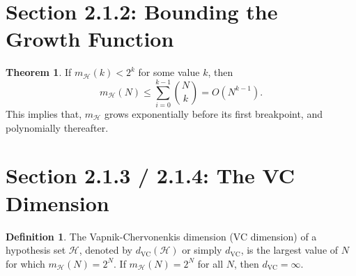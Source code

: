 \documentclass[10pt]{exam}
\theoremstyle{definition}
\newtheorem{problem}{Problem}
\newtheorem{defn}{Definition}
\newtheorem{fact}{Fact}
\newtheorem{theorem}{Theorem}
\newcommand{\R}{\mathbb R}
\newcommand{\mH}{m_{\mathcal H}}
\newcommand{\dvc}{{d_{\text{VC}}}}
\begin{document}
\newpage




\section*{Section 2.1.2: Bounding the Growth Function}

\begin{theorem}
    If $\mH(k) < 2^k$ for some value $k$, then
    \begin{equation}
        \mH(N)
        \le \sum_{i=0}^{k-1} {N \choose k}
        =
        O(N^{k-1})
        .
    \end{equation}
    This implies that, $\mH$ grows exponentially before its first breakpoint,
    and polynomially thereafter.
\end{theorem}

\newpage
\section*{Section 2.1.3 / 2.1.4: The VC Dimension}

\begin{defn}
    The Vapnik-Chervonenkis dimension (VC dimension) of a hypothesis set $\mathcal H$, denoted by $\dvc(\mathcal H)$ or simply $\dvc$, is the largest value of $N$ for which $\mH(N) = 2^N$.
    If $\mH(N) = 2^N$ for all $N$, then $\dvc = \infty$.
\end{defn}

%
\end{document}
